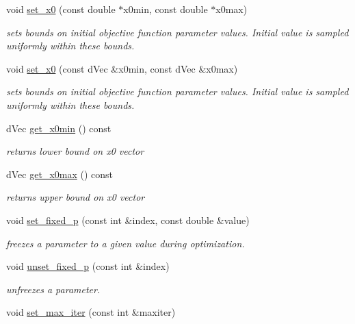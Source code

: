 \begin{DoxyCompactItemize}
void \hyperlink{classlibcmaes_1_1Parameters_addda8e395450878e87538df7b4032cbe}{set\-\_\-x0} (const double $\ast$x0min, const double $\ast$x0max)
\begin{DoxyCompactList}\small\item\em sets bounds on initial objective function parameter values. Initial value is sampled uniformly within these bounds. \end{DoxyCompactList}\item 
void \hyperlink{classlibcmaes_1_1Parameters_acc94e18faebb18dcaa0712a296e76949}{set\-\_\-x0} (const d\-Vec \&x0min, const d\-Vec \&x0max)
\begin{DoxyCompactList}\small\item\em sets bounds on initial objective function parameter values. Initial value is sampled uniformly within these bounds. \end{DoxyCompactList}\item 
d\-Vec \hyperlink{classlibcmaes_1_1Parameters_a1f7532a4bac9543094e7879baf3d73e1}{get\-\_\-x0min} () const 
\begin{DoxyCompactList}\small\item\em returns lower bound on x0 vector \end{DoxyCompactList}\item 
d\-Vec \hyperlink{classlibcmaes_1_1Parameters_adba08aae48f823c1611466ec86ae3b75}{get\-\_\-x0max} () const 
\begin{DoxyCompactList}\small\item\em returns upper bound on x0 vector \end{DoxyCompactList}\item 
void \hyperlink{classlibcmaes_1_1Parameters_a30236ca44b7de58b160bf2b1170f69b2}{set\-\_\-fixed\-\_\-p} (const int \&index, const double \&value)
\begin{DoxyCompactList}\small\item\em freezes a parameter to a given value during optimization. \end{DoxyCompactList}\item 
void \hyperlink{classlibcmaes_1_1Parameters_a540a57691845698e79af120f16d27f2c}{unset\-\_\-fixed\-\_\-p} (const int \&index)
\begin{DoxyCompactList}\small\item\em unfreezes a parameter. \end{DoxyCompactList}\item 
void \hyperlink{classlibcmaes_1_1Parameters_acefab965b50d45c6609e4f3267785ace}{set\-\_\-max\-\_\-iter} (const int \&maxiter)

\end{DoxyCompactItemize}
